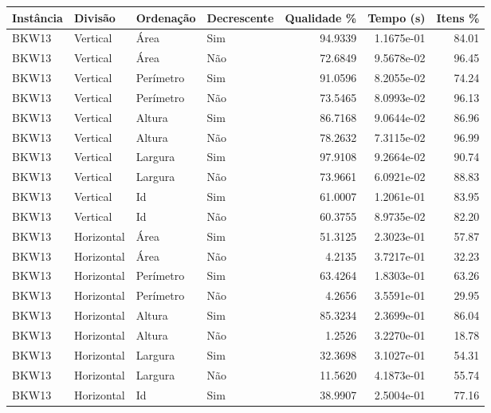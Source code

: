 \begin{tabular}{llllrrr}
\hline
Instância & Divisão    & Ordenação & Decrescente & Qualidade \% & Tempo (s)  & Itens \% \\
\hline
BKW13     & Vertical   & Área      & Sim         & 94.9339      & 1.1675e-01 & 84.01    \\
BKW13     & Vertical   & Área      & Não         & 72.6849      & 9.5678e-02 & 96.45    \\
BKW13     & Vertical   & Perímetro & Sim         & 91.0596      & 8.2055e-02 & 74.24    \\
BKW13     & Vertical   & Perímetro & Não         & 73.5465      & 8.0993e-02 & 96.13    \\
BKW13     & Vertical   & Altura    & Sim         & 86.7168      & 9.0644e-02 & 86.96    \\
BKW13     & Vertical   & Altura    & Não         & 78.2632      & 7.3115e-02 & 96.99    \\
BKW13     & Vertical   & Largura   & Sim         & 97.9108      & 9.2664e-02 & 90.74    \\
BKW13     & Vertical   & Largura   & Não         & 73.9661      & 6.0921e-02 & 88.83    \\
BKW13     & Vertical   & Id        & Sim         & 61.0007      & 1.2061e-01 & 83.95    \\
BKW13     & Vertical   & Id        & Não         & 60.3755      & 8.9735e-02 & 82.20    \\
BKW13     & Horizontal & Área      & Sim         & 51.3125      & 2.3023e-01 & 57.87    \\
BKW13     & Horizontal & Área      & Não         & 4.2135       & 3.7217e-01 & 32.23    \\
BKW13     & Horizontal & Perímetro & Sim         & 63.4264      & 1.8303e-01 & 63.26    \\
BKW13     & Horizontal & Perímetro & Não         & 4.2656       & 3.5591e-01 & 29.95    \\
BKW13     & Horizontal & Altura    & Sim         & 85.3234      & 2.3699e-01 & 86.04    \\
BKW13     & Horizontal & Altura    & Não         & 1.2526       & 3.2270e-01 & 18.78    \\
BKW13     & Horizontal & Largura   & Sim         & 32.3698      & 3.1027e-01 & 54.31    \\
BKW13     & Horizontal & Largura   & Não         & 11.5620      & 4.1873e-01 & 55.74    \\
BKW13     & Horizontal & Id        & Sim         & 38.9907      & 2.5004e-01 & 77.16    \\

\end{tabular}
